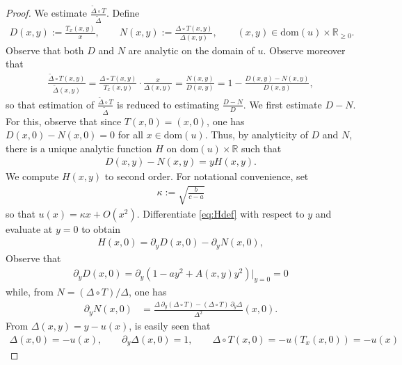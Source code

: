 \documentclass[10pt,a4paper]{amsart}
\newcommand{\RB}{\mathbb{R}}
\begin{document}
\begin{proof}
    We estimate $\frac{\widetilde{\Delta}\circ T}{\widetilde{\Delta}}$. Define
    \begin{align}
        D(x,y):=\frac{T_x(x,y)}{x},\qquad N(x,y):=\frac{\Delta\circ T(x,y)}{\Delta(x,y)},\qquad (x,y)\in\text{dom}(u)\times\RB_{\geq 0}.
    \end{align}
    Observe that both $D$ and $N$ are analytic on the domain of $u$. Observe moreover that
    \begin{align}
        \frac{\widetilde{\Delta}\circ T(x,y)}{\widetilde{\Delta}(x,y)} = \frac{\Delta\circ T(x,y)}{T_x(x,y)}\cdot \frac{x}{\Delta(x,y)} = \frac{N(x,y)}{D(x,y)} = 1-\frac{D(x,y)-N(x,y)}{D(x,y)},
    \end{align}
    so that estimation of $\frac{\widetilde{\Delta}\circ T}{\widetilde{\Delta}}$ is reduced to estimating $\frac{D-N}{D}$. We first estimate $D-N$. For this, observe that since $T(x,0) = (x,0)$, one has $D(x,0) - N(x,0) = 0$ for all $x\in\text{dom}(u)$. Thus, by analyticity of $D$ and $N$, there is a unique analytic function $H$ on $\text{dom}(u)\times\RB$ such that 
    \begin{align}\label{eq:Hdef}
        D(x,y) - N(x,y)= yH(x,y).
    \end{align}
    We compute $H(x,y)$ to second order. For notational convenience, set
    \begin{align}
        \kappa:=\sqrt{\frac{b}{c-a}}
    \end{align}
    so that $u(x) = \kappa x+O(x^2)$. Differentiate \eqref{eq:Hdef} with respect to $y$ and evaluate at $y=0$ to obtain
    \begin{align}
        H(x,0) = \partial_yD(x,0)-\partial_yN(x,0),
    \end{align}
    Observe that
    \begin{align}
        \partial_yD(x,0) = \partial_y(1-ay^2 + A(x,y)y^2)|_{y=0} = 0
    \end{align}
    while, from $N = (\Delta\circ T)/\Delta$, one has
    \begin{align}
        \partial_yN(x,0) &= \frac{\Delta\,\partial_y(\Delta\circ T)-(\Delta\circ T)\,\partial_y\Delta}{\Delta^2}(x,0).\label{eq:firstpartialN}
    \end{align}
    From $\Delta(x,y) = y-u(x)$, is easily seen that
    \begin{align}
        \Delta(x,0) = -u(x),\qquad \partial_y\Delta(x,0) = 1,\qquad \Delta\circ T(x,0) = -u(T_x(x,0)) = -u(x)
    \end{align}

\end{proof}
\end{document}
